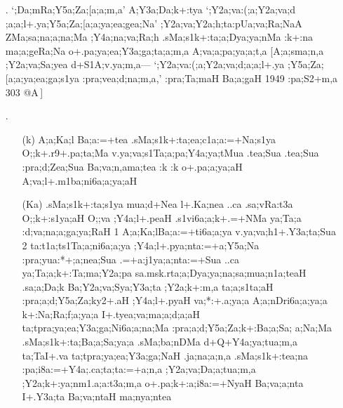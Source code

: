 \begin{spacing}{1.15}
\begin{itemize}
 \item[{\sktf 6}.]  `{\sktf ;Da;mRa;Y5a;Za;[a;a;m,a}' {\sktf
A;Y3a;Da;k+:tya} `{\sktf ;Y2a;va:(;a;Y2a;va;d%
;a;a;l+.ya\ZF{-};Y5a;Za;[a;a;ya;ea;gea;Na}' {\sktf
;Y2a;va;Y2a;h;ta\ZF{-}:pUa;va;Ra;NaA} {\sktf ZMa;sa;na;a;na;Ma ;Y4a;na;va;Ra;h\ZF{,}
.sMa;s1k+:ta;a;Dya;ya;nMa :k+:na ma;a;geRa;Na
o+.pa;ya;ea;Y3a;ga;ta;a;m,a A;va;a;pa;ya;a;t,a%
} [{\sktf A;a;sma;n,a ;Y2a;va;Sa{;yea}
d+S1A;v.ya;m,a}{\rm ---} `{\sktf ;Y2a;va:(;a;Y2a;va;d;a;a;l+.ya%
\ZF{-};Y5a;Za;[a;a;ya;ea;ga;s1ya :pra;vea;d;na;m,a},' {\sktf :pra;Ta;maH
Ba;a;gaH 1949\ZF{,} :pa;S2+m,a 303 @A}\,]   
 
 \item[{\sktf 7}.] \begin{itemize}
  \item[({\sktf k})]  {\sktf A;a;Ka;l Ba;a:=+tea
.sMa;s1k+:ta;ea;c1a;a:=+Na;s1ya O;;k+.r9+.pa;ta;Ma
v.ya;va;s1Ta;a;pa;Y4a;ya;tMua .tea;Sua .tea;Sua :pra;d;Zea;Sua
Ba;va;n,ama;tea :k :k o+.pa;a;ya;aH
A;va;l+.m1ba;ni6a;a;ya;aH} 
            
  \item[({\sktf Ka})] {\sktf .sMa;s1k+:ta;s1ya
mua;d+Nea l+.Ka;nea ..ca .sa;vRa:t3a
O;;k+:s1ya;aH O;;va ;Y4a;l+.peaH .s1vi6a;a;k+.=+NMa
\ZF{(}ya;Ta;a\ZF{,} :d;va;na;a;ga;ya;RaH\ZF{)} \ZF{(}1\ZF{)} A;a;Ka;l\ZF{-}Ba;a:=+ti6a;a;ya%
\ZF{-}v.ya;va;h1+.Y3a;ta;Sua\ZF{,} \ZF{(}2\ZF{)} ta:t1a;ts1Ta;a;ni6a;a;ya%
\ZF{-};Y4a;l+.pya;nta:=+a;Y5a;Na :pra;yua:*+;a;nea;Sua
.=+a:j1ya;a;nta:=+Sua ..ca ya;Ta;a;k{+:Ta};ma;Y2a;pa} {\sktf sa.msk.r}{\sktf ta;a;Dya;ya;na;sa;mua;n1a;teaH
.sa;a;Da;k Ba;Y2a;va;Sya;Y3a;ta ;Y2a;k+:m,a
ta;a;s1ta;aH :pra;a;d;Y5a;Za;ky2+.aH ;Y4a;l+.pyaH
\ZF{(}va;*:+.a;ya;a\ZF{,}
A;a;nDri6a;a;ya;a\ZF{,} k+:Na;Ra;f;a;ya;a\ZF{,} I+.tyea;va;ma;a;d;a;aH%
\ZF{)} ta;tpra;ya;ea;Y3a;ga;Ni6a;a;na;Ma :pra;a;d;Y5a;Za;k+:Ba;a;Sa;%
a;Na;Ma .sMa;s1k+:ta;Ba;a;Sa;ya;a .sMa;ba;nDMa
d+Q+Y4a;ya;tua;m,a\ZF{,} ta;TaI+.va ta;tpra;ya;ea;Y3a;ga;NaH .ja;na;a;n,a .sMa;s1k+:tea;na :pa;i8a:=+Y4a;.ca;ta;ta:=+a;n,a ;Y2a;va;Da;a;tua;m,a\ZF{,}
;Y2a;k+:ya;nm1.a;a:t3a;m,a o+.pa;k+:a;i8a:=+NyaH
Ba;va;a;nta I+.Y3a;ta Ba;va;ntaH ma;nya;ntea}
	
 \end{itemize}
\end{itemize}
\end{spacing}

